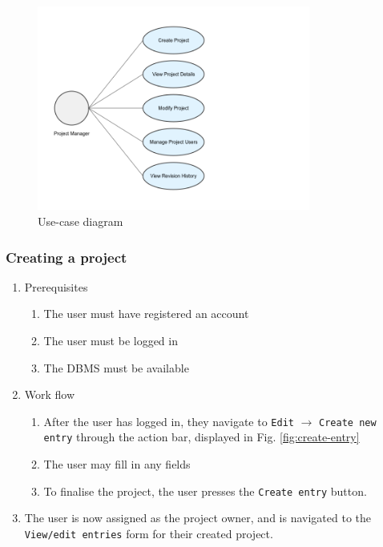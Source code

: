 \documentclass{report}
\begin{document}
	\begin{figure}[h]
		\centering
		\includegraphics[width=0.8\textwidth]{use-cases}
		\caption{Use-case diagram}
		\label{fig:use-cases}
	\end{figure}
	
	\subsubsection{Creating a project}
	
	\begin{enumerate}
		\item Prerequisites
		\begin{enumerate}
			\item The user must have registered an account
			\item The user must be logged in
			\item The DBMS must be available
		\end{enumerate}
		\item Work flow
		\begin{enumerate}
			\item After the user has logged in, they navigate to \verb|Edit| $\rightarrow$ \verb|Create new entry|
					  through the action bar, displayed in Fig. \ref{fig:create-entry}
			\item The user may fill in any fields
			\item To finalise the project, the user presses the \verb|Create entry| button.
		\end{enumerate}
		\item The user is now assigned as the project owner, and is navigated to the \verb|View/edit entries|
				  form for their created project.
	\end{enumerate}
	
\end{document}
